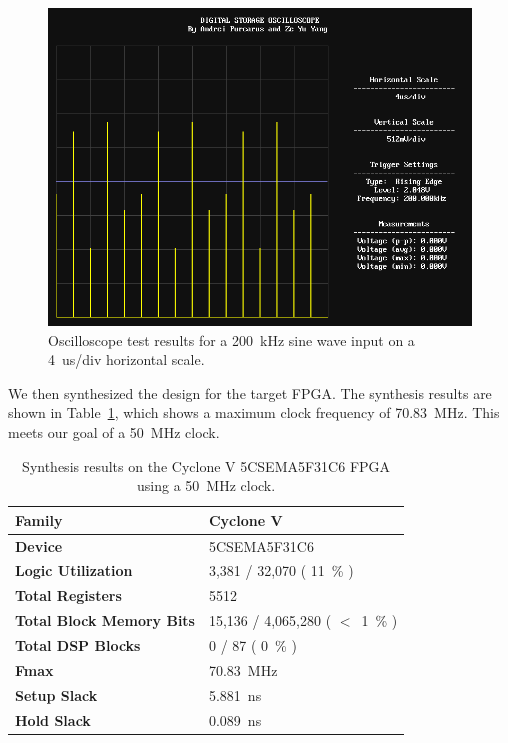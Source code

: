 \documentclass[journal]{IEEEtran}
\begin{document}
\begin{figure}[!htb]
  \centering
  \includegraphics[width=\columnwidth]{test-results/scope_demo_200kHz.png}
  \caption{Oscilloscope test results for a 200~kHz sine wave input on a 4~us/div horizontal scale.}
  \label{fig:scope_test_4}
\end{figure}

We then synthesized the design for the target FPGA. The synthesis results are shown in Table~\ref{tab:synthesis_results}, which shows a maximum clock frequency of 70.83~MHz. This meets our goal of a 50~MHz clock.

\begin{table}[!htb]
    \centering
    \caption{Synthesis results on the Cyclone V 5CSEMA5F31C6 FPGA using a 50~MHz clock.}
    \label{tab:synthesis_results}
    \begin{tabular}[c]{ | l | l | }
    	\hline
        \textbf{Family} & Cyclone V \\
        \hline
        \textbf{Device} & 5CSEMA5F31C6 \\
        \hline
        \textbf{Logic Utilization} & 3,381 / 32,070 ( 11~\% ) \\
        \hline
        \textbf{Total Registers} & 5512 \\
        \hline
        \textbf{Total Block Memory Bits} & 15,136 / 4,065,280 ( $<$~1~\% ) \\
        \hline
        \textbf{Total DSP Blocks} & 0 / 87 ( 0~\% ) \\
        \hline
        \textbf{Fmax} & 70.83~MHz \\
        \hline
        \textbf{Setup Slack} & 5.881~ns \\
        \hline
        \textbf{Hold Slack} & 0.089~ns \\
        \hline
    \end{tabular}
\end{table}
\end{document}
